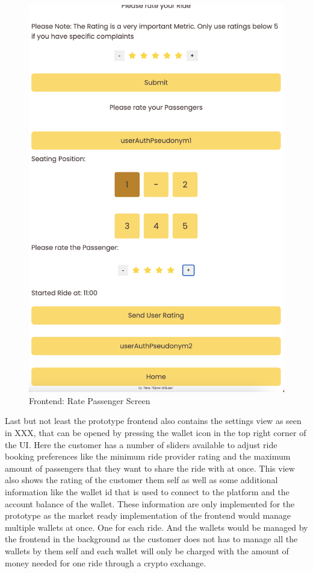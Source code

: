 \begin{figure}[H]
\begin{minipage}{0.45\linewidth}
        \includegraphics[width=\linewidth]{data/ffss/12.png}
        \caption{Frontend: Rate Passenger Screen}
        \label{fig:RatePassengerScreen}
    \end{minipage}
    
\end{figure}

Last but not least the prototype frontend  also contains the settings view as seen in XXX, that can be opened by pressing the wallet icon in the top right corner of the UI. Here the customer has a number of sliders available to adjust ride booking preferences like the minimum ride provider rating and the maximum amount of passengers that they want to share the ride with at once. This view also shows the rating of the customer them self as well as some additional information like the wallet id that is used to connect to the platform and the account balance of the wallet. These information are only implemented for the prototype as the market ready implementation of the frontend would manage multiple wallets at once. One for each ride. And the wallets would be managed by the frontend in the background as the customer does not has to manage all the wallets by them self and each wallet will only be charged with the amount of money needed for one ride through a crypto exchange.

